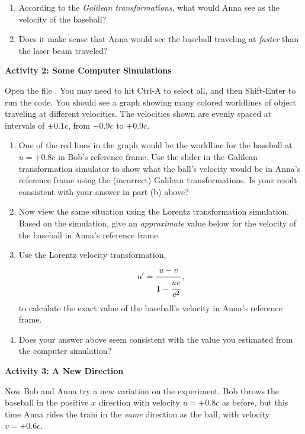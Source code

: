\begin{enumerate}[labparts]
\item According to the \textit{Galilean transformations}, what would Anna see as the velocity of the baseball?
\answerspace{0.5in}

\item Does it make sense that Anna would see the baseball traveling at \textit{faster} than the laser beam traveled?
\answerspace{0.5in}
\end{enumerate}

\textbf{Activity 2: Some Computer Simulations}

Open the file .  You may need to hit Ctrl-A to select all, and then Shift-Enter to run the code.  You should see a graph showing many colored worldlines of object traveling at different velocities.  The velocities shown are evenly spaced at intervals of $\pm0.1c$, from $-0.9c$ to $+0.9c$.

\begin{enumerate}[labparts]
\item One of the red lines in the graph would be the worldline for the baseball at $u=+0.8c$ in Bob's reference frame.  Use the slider in the Galilean transformation simulator to show what the ball's velocity would be in Anna's reference frame using the (incorrect) Galilean transformations.  Is your result consistent with your answer in part (b) above?
\answerspace{0.5in}

\item Now view the same situation using the Lorentz transformation simulation.  Based on the simulation, give an \textit{approximate} value below for the velocity of the baseball in Anna's reference frame.
\answerspace{0.5in}

\item Use the Lorentz velocity transformation,
$$u'=\cfrac{u-v}{1-\cfrac{uv}{c^2}}\,,$$
to calculate the exact value of the baseball's velocity in Anna's reference frame.  
\answerspace{1.5in}

\item Does your answer above seem consistent with the value you estimated from the computer simulation?
\answerspace{0.5in}
\end{enumerate}

\textbf{Activity 3: A New Direction}

Now Bob and Anna try a new variation on the experiment.  Bob throws the baseball in the positive $x$ direction with velocity $u=+0.8c$ as before, but this time Anna rides the train in the \textit{same} direction as the ball, with velocity $v=+0.6c$.

